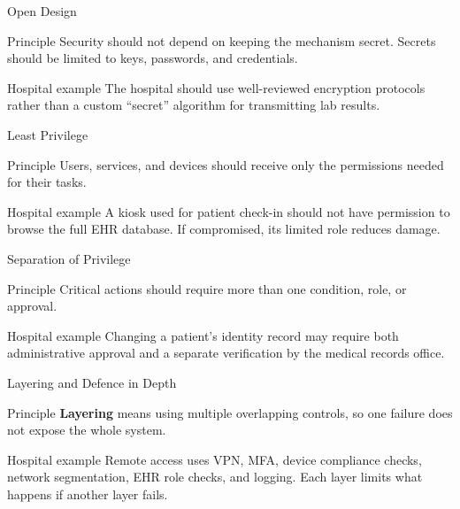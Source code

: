 \documentclass[presentation]{beamer}
\begin{document}
\begin{frame}[c]{Open Design}
\begin{block}{Principle}
Security should not depend on keeping the mechanism secret. Secrets should be limited to keys,
passwords, and credentials.
\end{block}

\begin{exampleblock}{Hospital example}
The hospital should use well-reviewed encryption protocols rather than a custom ``secret''
algorithm for transmitting lab results.
\end{exampleblock}
\end{frame}

\begin{frame}[c]{Least Privilege}
\begin{block}{Principle}
Users, services, and devices should receive only the permissions needed for their tasks.
\end{block}

\begin{exampleblock}{Hospital example}
A kiosk used for patient check-in should not have permission to browse the full EHR database.
If compromised, its limited role reduces damage.
\end{exampleblock}
\end{frame}

\begin{frame}[c]{Separation of Privilege}
\begin{block}{Principle}
Critical actions should require more than one condition, role, or approval.
\end{block}

\begin{exampleblock}{Hospital example}
Changing a patient's identity record may require both administrative approval and a separate
verification by the medical records office.
\end{exampleblock}
\end{frame}

\begin{frame}[c]{Layering and Defence in Depth}
\begin{block}{Principle}
\textbf{Layering} means using multiple overlapping controls, so one failure does not expose the
whole system.
\end{block}

\begin{exampleblock}{Hospital example}
Remote access uses VPN, MFA, device compliance checks, network segmentation, EHR role checks,
and logging. Each layer limits what happens if another layer fails.
\end{exampleblock}
\end{frame}
\end{document}
